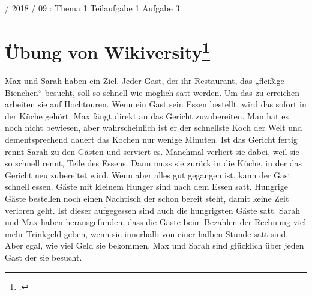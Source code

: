 \documentclass{lehramt-informatik}
\begin{document}

 / 2018 / 09 : Thema 1 Teilaufgabe 1 Aufgabe 3

%

\section{Übung von Wikiversity\footcite{net:pdf:wikiversity:zustandsdiagramm}}

Max und Sarah haben ein Ziel. Jeder Gast, der ihr Restaurant, das
„fleißige Bienchen“ besucht, soll so schnell wie möglich satt werden. Um
das zu erreichen arbeiten sie auf Hochtouren. Wenn ein Gast sein Essen
bestellt, wird das sofort in der Küche gehört. Max fängt direkt an das
Gericht zuzubereiten. Man hat es noch nicht bewiesen, aber
wahrscheinlich ist er der schnellste Koch der Welt und dementsprechend
dauert das Kochen nur wenige Minuten. Ist das Gericht fertig rennt Sarah
zu den Gästen und serviert es. Manchmal verliert sie dabei, weil sie so
schnell rennt, Teile des Essens. Dann muss sie zurück in die Küche, in
der das Gericht neu zubereitet wird. Wenn aber alles gut gegangen ist,
kann der Gast schnell essen. Gäste mit kleinem Hunger sind nach dem
Essen satt. Hungrige Gäste bestellen noch einen Nachtisch der schon
bereit steht, damit keine Zeit verloren geht. Ist dieser aufgegessen
sind auch die hungrigsten Gäste satt. Sarah und Max haben
herausgefunden, dass die Gäste beim Bezahlen der Rechnung viel mehr
Trinkgeld geben, wenn sie innerhalb von einer halben Stunde satt sind.
Aber egal, wie viel Geld sie bekommen. Max und Sarah sind glücklich über
jeden Gast der sie besucht.


\literatur
\end{document}
